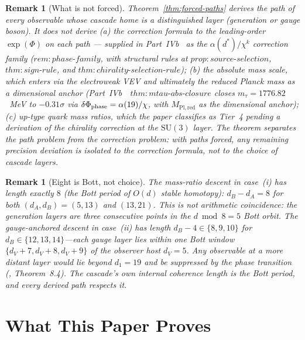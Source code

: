 \documentclass[12pt,a4paper]{article}
\newtheorem{remark}[theorem]{Remark}
\begin{document}
\begin{remark}[What is not forced]\label{rem:not-forced}
Theorem~\ref{thm:forced-paths} derives the \emph{path} of every observable whose cascade home is a distinguished layer (generation or gauge boson). It does \emph{not} derive (a) the \emph{correction formula} to the leading-order $\exp(\Phi)$ on each path --- supplied in Part~IVb~\cite{part4b} as the $\alpha(d^*)/\chi^k$ correction family ($\mathit{rem{:}phase\text{-}family}$, with structural rules at $\mathit{prop{:}source\text{-}selection}$, $\mathit{thm{:}sign\text{-}rule}$, and $\mathit{thm{:}chirality\text{-}selection\text{-}rule}$); (b) the absolute mass scale, which enters via the electroweak VEV and ultimately the reduced Planck mass as a dimensional anchor (Part~IVb~\cite{part4b}~$\mathit{thm{:}mtau\text{-}abs\text{-}closure}$ closes $m_\tau = 1776.82$~MeV to $-0.31\sigma$ via $\delta\Phi_{\rm phase}=\alpha(19)/\chi$, with $M_{\mathrm{Pl,red}}$ as the dimensional anchor); (c) up-type quark mass ratios, which the paper classifies as Tier~4 pending a derivation of the chirality correction at the $\mathrm{SU}(3)$ layer. The theorem separates the path problem from the correction problem: with paths forced, any remaining precision deviation is isolated to the correction formula, not to the choice of cascade layers.
\end{remark}

\begin{remark}[Eight is Bott, not choice]\label{rem:bott-length}
The mass-ratio descent in case~(i) has length exactly $8$ (the Bott period of $O(d)$ stable homotopy): $d_B-d_A=8$ for both $(d_A,d_B)=(5,13)$ and $(13,21)$. This is not arithmetic coincidence: the generation layers are three consecutive points in the $d\bmod 8 = 5$ Bott orbit. The gauge-anchored descent in case~(ii) has length $d_B-4 \in\{8,9,10\}$ for $d_B\in\{12,13,14\}$---each gauge layer lies within one Bott window $\{d_V+7,d_V+8,d_V+9\}$ of the observer host $d_V=5$. Any observable at a more distant layer would lie beyond $d_1=19$ and be suppressed by the phase transition (\cite{part0}, Theorem~8.4). The cascade's own internal coherence length is the Bott period, and every derived path respects it.
\end{remark}

\section{What This Paper Proves}\label{sec:what-this-paper-proves}
\end{document}
